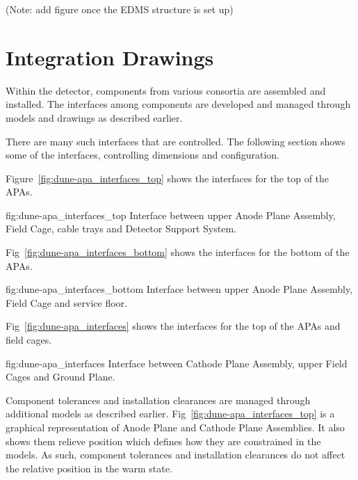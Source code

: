 (Note: add figure once the EDMS structure is set up)



\section{Integration Drawings}
\label{sec:fdsp-coord-integ-drawings}
Within the detector, components from various consortia are assembled
and installed. The interfaces among components are developed and
managed through models and drawings as described earlier.

There are many such interfaces that are controlled. The following
section shows some of the interfaces, controlling dimensions and
configuration.

Figure~\ref{fig:dune-apa_interfaces_top} shows the interfaces for the top of the APAs.
\begin{dunefigure}{fig:dune-apa_interfaces_top}
  {Interface between upper Anode Plane Assembly, Field Cage, cable trays and Detector Support System.}
\end{dunefigure}

Fig~\ref{fig:dune-apa_interfaces_bottom} shows the interfaces for the bottom of the APAs.
\begin{dunefigure}{fig:dune-apa_interfaces_bottom}
  {Interface between upper Anode Plane Assembly, Field Cage and service floor.}
\end{dunefigure}

Fig~\ref{fig:dune-apa_interfaces} shows the interfaces for the top of the APAs and field cages.
\begin{dunefigure}{fig:dune-apa_interfaces}
  {Interface between Cathode Plane Assembly, upper Field Cages and Ground Plane.}
\end{dunefigure}

Component tolerances and installation clearances are managed through
additional models as described
earlier. Fig~\ref{fig:dune-apa_interfaces_top} is a graphical
representation of Anode Plane and Cathode Plane Assemblies. It also
shows them relieve position which defines how they are constrained in
the models. As such, component tolerances and installation clearances
do not affect the relative position in the warm state.

